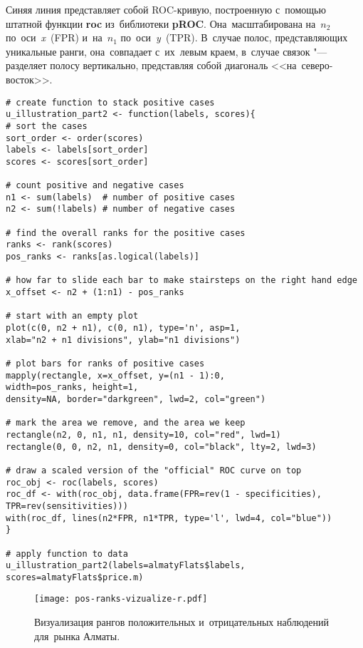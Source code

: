 \documentclass[]{scrreprt}
\begin{document}
Синяя линия представляет собой ROC-кривую, построенную с~помощью штатной функции \textbf{roc} из~библиотеки \textbf{pROC}. Она~масштабирована на~$n_{2}$ по~оси~\textit{x}~(FPR) и~на~$n_{1}$ по~оси~\textit{y}~(TPR). В~случае полос, представляющих уникальные ранги, она~совпадает с~их~левым краем, в~случае связок "--- разделяет полосу вертикально, представляя собой диагональ <<на~северо-восток>>.
%
\begin{lstlisting}[float, caption = Визуализация рангов положительных наблюдений для~рынка Алматы, firstnumber=1, label= lst:vizualize-pos-cases-almaty-R]
# create function to stack positive cases
u_illustration_part2 <- function(labels, scores){
# sort the cases
sort_order <- order(scores)
labels <- labels[sort_order]
scores <- scores[sort_order]

# count positive and negative cases
n1 <- sum(labels)  # number of positive cases
n2 <- sum(!labels) # number of negative cases

# find the overall ranks for the positive cases
ranks <- rank(scores)
pos_ranks <- ranks[as.logical(labels)]

# how far to slide each bar to make stairsteps on the right hand edge
x_offset <- n2 + (1:n1) - pos_ranks

# start with an empty plot  
plot(c(0, n2 + n1), c(0, n1), type='n', asp=1,
xlab="n2 + n1 divisions", ylab="n1 divisions")

# plot bars for ranks of positive cases
mapply(rectangle, x=x_offset, y=(n1 - 1):0, 
width=pos_ranks, height=1,
density=NA, border="darkgreen", lwd=2, col="green")

# mark the area we remove, and the area we keep
rectangle(n2, 0, n1, n1, density=10, col="red", lwd=1)
rectangle(0, 0, n2, n1, density=0, col="black", lty=2, lwd=3)

# draw a scaled version of the "official" ROC curve on top
roc_obj <- roc(labels, scores)
roc_df <- with(roc_obj, data.frame(FPR=rev(1 - specificities), 
TPR=rev(sensitivities)))
with(roc_df, lines(n2*FPR, n1*TPR, type='l', lwd=4, col="blue"))
}

# apply function to data
u_illustration_part2(labels=almatyFlats$labels, scores=almatyFlats$price.m)
\end{lstlisting}
%
\begin{figure}[ht]
	\centering
	\texttt{[image: pos-ranks-vizualize-r.pdf]}
	\caption{Визуализация рангов положительных и~отрицательных наблюдений для~рынка Алматы.}
	\label{fig:pos-ranks-vizualize-r.pdf}
\end{figure}
%
\clearpage
\end{document}
